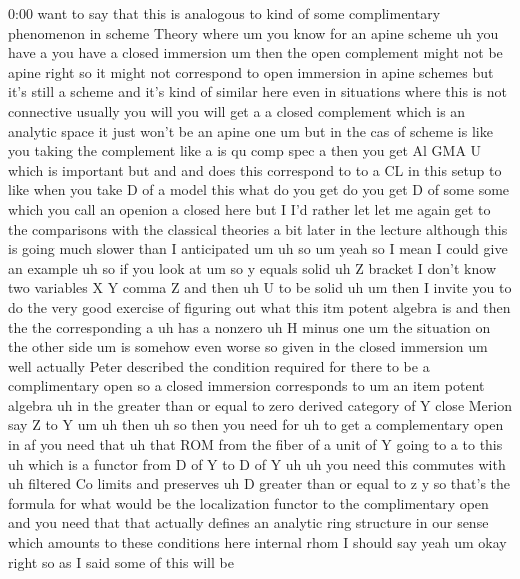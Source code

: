 \begin{unfinished}{0:00}
want  to  say  that  this  is  analogous  to
kind  of  some  complimentary  phenomenon  in
scheme  Theory  where  um  you  know  for  an
apine  scheme
uh  you  have  a  you  have  a  closed
immersion  um  then  the  open  complement
might  not  be  apine  right  so  it  might  not
correspond  to  open  immersion  in  apine
schemes  but  it's  still  a  scheme  and  it's
kind  of  similar  here  even  in
situations  where  this  is  not  connective
usually  you  will  you  will  get  a  a  closed
complement  which  is  an  analytic  space  it
just  won't  be  an  apine  one  um  but  in  the
cas  of  scheme  is  like  you  taking  the
complement  like  a  is  qu  comp  spec  a  then
you  get  Al  GMA  U  which  is  important  but
and  and  does  this  correspond  to  to  a  CL
in  this  setup  to  like  when  you  take  D  of
a  model  this  what  do  you  get  do  you  get
D  of
some  some  which  you  call  an  openion  a
closed  here  but  I  I'd  rather  let  let  me
again  get  to  the  comparisons  with  the
classical  theories  a  bit  later  in  the
lecture  although  this  is  going  much
slower  than  I  anticipated
um  uh  so  um  yeah  so  I  mean  I  could  give
an  example  uh  so  if  you  look  at  um  so  y
equals
solid  uh  Z  bracket  I  don't  know  two
variables  X  Y  comma  Z  and  then  uh  U  to
be
solid
uh  um  then  I  invite  you  to  do  the  very
good  exercise  of  figuring  out  what  this
itm  potent  algebra  is  and  then  the  the
corresponding
a  uh  has  a
nonzero  uh  H  minus
one
um  the
situation  on  the  other  side  um  is
somehow  even  worse  so  given  in  the
closed
immersion
um  well  actually  Peter  described  the
condition  required  for  there  to  be  a
complimentary  open  so  a  closed  immersion
corresponds  to  um  an  item  potent
algebra  uh  in  the  greater  than  or  equal
to  zero  derived  category  of  Y  close
Merion  say  Z  to
Y
um  uh  then  uh  so  then  you  need
for
uh  to  get  a  complementary
open  in
af  you  need  that  uh  that
ROM  from  the  fiber  of  a  unit  of  Y  going
to  a  to  this  uh  which  is  a  functor  from
D  of  Y  to  D  of  Y
uh
uh  you  need  this  commutes
with  uh  filtered  Co
limits  and
preserves  uh  D  greater  than  or  equal  to
z  y  so  that's  the  formula  for  what  would
be  the  localization  functor  to  the
complimentary  open  and  you  need  that
that  actually  defines  an  analytic  ring
structure  in  our  sense  which  amounts  to
these  conditions
here  internal  rhom  I  should  say
yeah
um
okay
right  so  as  I  said  some  of  this  will  be

\end{unfinished}
